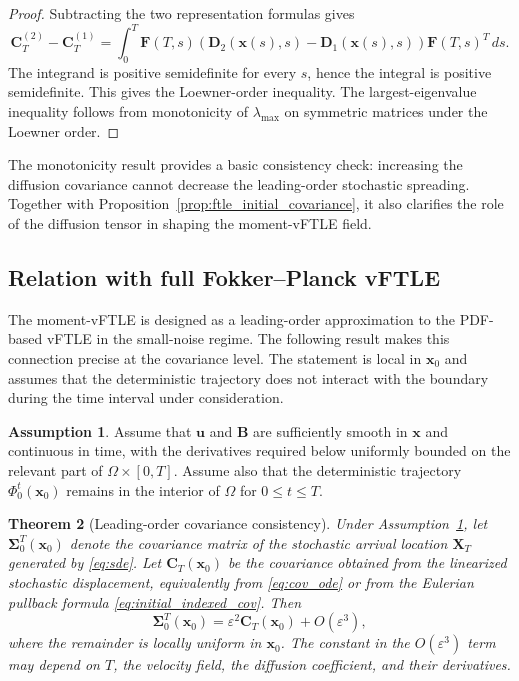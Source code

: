 \documentclass[a4paper,11pt]{article}
\numberwithin{equation}{section}
\theoremstyle{plain}
\newtheorem{theorem}{Theorem}[section]
\theoremstyle{definition}
\newtheorem{assumption}[theorem]{Assumption}
\theoremstyle{remark}
\newcommand{\bx}{\mathbf{x}}
\newcommand{\bu}{\mathbf{u}}
\newcommand{\bX}{\mathbf{X}}
\newcommand{\bB}{\mathbf{B}}
\newcommand{\bC}{\mathbf{C}}
\newcommand{\bD}{\mathbf{D}}
\newcommand{\bF}{\mathbf{F}}
\newcommand{\bSigma}{\boldsymbol{\Sigma}}
\newcommand{\lmax}{\lambda_{\max}}
\newcommand{\flow}[2]{\Phi_{#1}^{#2}}
\begin{document}
\begin{proof}
Subtracting the two representation formulas gives
\[
    \bC_T^{(2)}-\bC_T^{(1)}
    =
    \int_0^T
    \bF(T,s)\left(\bD_2(\bx(s),s)-\bD_1(\bx(s),s)\right)\bF(T,s)^T\,ds .
\]
The integrand is positive semidefinite for every \(s\), hence the integral is positive semidefinite.  This gives the Loewner-order inequality.  The largest-eigenvalue inequality follows from monotonicity of \(\lmax\) on symmetric matrices under the Loewner order.
\end{proof}

The monotonicity result provides a basic consistency check: increasing the diffusion covariance cannot decrease the leading-order stochastic spreading.  Together with Proposition~\ref{prop:ftle_initial_covariance}, it also clarifies the role of the diffusion tensor in shaping the moment-vFTLE field.


\subsection{Relation with full Fokker--Planck vFTLE}

The moment-vFTLE is designed as a leading-order approximation to the PDF-based vFTLE in the small-noise regime.  The following result makes this connection precise at the covariance level.  The statement is local in \(\bx_0\) and assumes that the deterministic trajectory does not interact with the boundary during the time interval under consideration.

\begin{assumption}\label{ass:smoothness}
Assume that \(\bu\) and \(\bB\) are sufficiently smooth in \(\bx\) and continuous in time, with the derivatives required below uniformly bounded on the relevant part of \(\Omega\times[0,T]\).  Assume also that the deterministic trajectory \(\flow{0}{t}(\bx_0)\) remains in the interior of \(\Omega\) for \(0\leq t\leq T\).
\end{assumption}

\begin{theorem}[Leading-order covariance consistency]\label{thm:cov_consistency}
Under Assumption~\ref{ass:smoothness}, let \(\bSigma_0^T(\bx_0)\) denote the covariance matrix of the stochastic arrival location \(\bX_T\) generated by \eqref{eq:sde}.  Let \(\bC_T(\bx_0)\) be the covariance obtained from the linearized stochastic displacement, equivalently from \eqref{eq:cov_ode} or from the Eulerian pullback formula \eqref{eq:initial_indexed_cov}.  Then
\begin{equation}
    \bSigma_0^T(\bx_0)
    =
    \varepsilon^2\bC_T(\bx_0)+O(\varepsilon^3),
    \label{eq:cov_consistency}
\end{equation}
where the remainder is locally uniform in \(\bx_0\).  The constant in the \(O(\varepsilon^3)\) term may depend on \(T\), the velocity field, the diffusion coefficient, and their derivatives.
\end{theorem}
\end{document}
